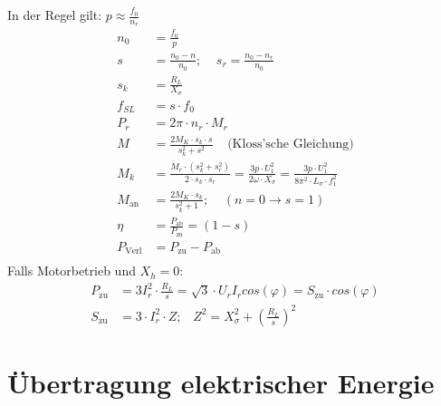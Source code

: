 \documentclass[a4paper,twocolumn,10pt]{article}
\begin{document}
In der Regel gilt: $p\approx\frac{f_0}{n_r}$
\begin{equation*}
\begin{split}
n_0&=\frac{f_0}{p}\\
s&=\frac{n_0-n}{n_0};\;\;\;\;s_r=\frac{n_0-n_r}{n_0}\\
s_k&=\frac{R_L}{X_{\sigma}}\\
f_{SL}&=s\cdot f_0\\
P_r&=2\pi\cdot n_r\cdot M_r\\
M&=\frac{2M_K\cdot s_k\cdot s}{s_k^2+s^2}\;\;\;\;\text{(Kloss'sche Gleichung)}\\
M_k&=\frac{M_r\cdot\left(s_k^2+s_r^2\right)}{2\cdot s_k\cdot s_r}=\frac{3p\cdot U_1^2}{2\omega\cdot X_{\sigma}}=\frac{3p\cdot U_1^2}{8\pi^2\cdot L_{\sigma}\cdot f_1^2}\\
M_{\text{an}}&=\frac{2M_K\cdot s_k}{s_k^2+1};\;\;\;\;(n=0\rightarrow s=1)\\
\eta&=\frac{P_{\text{ab}}}{P_{\text{zu}}}=(1-s)\\
P_{\text{Verl}}&=P_{\text{zu}}-P_{\text{ab}}\\
\end{split}
\end{equation*}
Falls Motorbetrieb und $X_h=0$:
\begin{equation*}
\begin{split}
P_{\text{zu}}&=3I_r^2\cdot\frac{R_L}{s}=\sqrt{3}\cdot U_rI_rcos(\varphi)=S_{\text{zu}}\cdot cos(\varphi)\\
S_{\text{zu}}&=3\cdot I_r^2\cdot Z;\;\;\;Z^2=X_{\sigma}^2+\left(\frac{R_L}{s}\right)^2
\end{split}
\end{equation*}


\section{Übertragung elektrischer Energie}
\end{document}
